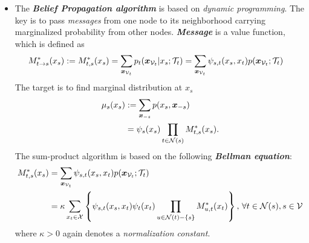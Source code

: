 \documentclass[11pt]{article}
\begin{document}
\begin{itemize}
\item The \textbf{\emph{Belief Propagation algorithm}} is based on \emph{dynamic programming}. The key is to pass \emph{messages} from one node to its neighborhood carrying marginalized probability from other nodes. \emph{\textbf{Message}} is a value function, which is defined as 
\begin{align}
M_{t \rightarrow s}^{*}(x_s) := M_{t,s}^{*}(x_s) &= \sum_{\boldsymbol{x}_{{\mathcal V}_{t}}}p_{t}(\boldsymbol{x}_{{\mathcal V}_{t}}|x_s; {\mathcal T}_{t})
= \sum_{\boldsymbol{x}_{{\mathcal V}_t}}\psi_{s,t}(x_s, x_t)p(\boldsymbol{x}_{{\mathcal V}_t}; {\mathcal T}_{t})  \label{eqn: mrf_tree_sum_product_message} 
\end{align}
The target is to find marginal distribution at $x_s$
\begin{align}
\mu_{s}(x_{s}) &:= \sum_{\boldsymbol{x}_{-s}}p(x_s, \boldsymbol{x}_{-s}) \nonumber\\
&=\psi_{s}(x_s)\prod_{t \in {\mathcal N}(s)}M_{t,s}^{*}(x_s). \label{eqn: mrf_tree_sum_product_marginal} 
\end{align}
The sum-product algorithm is based on the following \emph{\textbf{Bellman equation}}:
\begin{align}
M_{t,s}^{*}(x_s) &= \sum_{\boldsymbol{x}_{{\mathcal V}_t}}\psi_{s,t}(x_s, x_t)p(\boldsymbol{x}_{{\mathcal V}_t}; {\mathcal T}_{t}) \nonumber\\
&= \kappa \sum_{x_t \in {\mathcal X}}\left\{\psi_{s,t}(x_s, x_t)\psi_{t}(x_t)\prod_{u \in {\mathcal N}(t) - \left\{s\right\}}M_{u,t}^{*}(x_t)\right\}, \,  \forall t\in {\mathcal N}(s),  s \in {\mathcal V} \label{eqn: mrf_tree_sum_product_bellman_equation}
\end{align} where $\kappa > 0$ again denotes a \emph{normalization constant}. 

\end{itemize}

\newpage
\end{document}
